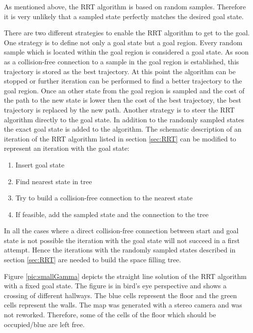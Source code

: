 As mentioned above, the RRT algorithm is based on random samples. Therefore it is very unlikely that a sampled state perfectly matches the desired goal state. \newline

There are two different strategies to enable the RRT algorithm to get to the goal. One strategy is to define not only a goal state but a goal region. Every random sample which is located within the goal region is considered a goal state. As soon as a collision-free connection to a sample in the goal region is established, this trajectory is stored as the best trajectory. At this point the algorithm can be stopped or further iteration can be performed to find a better trajectory to the goal region. Once an other state from the goal region is sampled and the cost of the path to the new state is lower then the cost of the best trajectory, the best trajectory is replaced by the new path. \newline
Another strategy is to steer the RRT algorithm directly to the goal state. In addition to the randomly sampled states the exact goal state is added to the algorithm. The schematic description of an iteration of the RRT algorithm listed in section \ref{sec:RRT} can be modified to represent an iteration with the goal state:

\begin{enumerate}
  \item Insert goal state
  \item Find nearest state in tree
  \item Try to build a collision-free connection to the nearest state
  \item If feasible, add the sampled state and the connection to the tree
\end{enumerate}

In all the cases where a direct collision-free connection between start and goal state is not possible the iteration with the goal state will not succeed in a first attempt. Hence the iterations with the randomly sampled states described in section \ref{sec:RRT} are needed to build the space filling tree.\newline

Figure \ref{pic:smallGamma} depicts the straight line solution of the RRT algorithm with a fixed goal state. The figure is in bird's eye perspective and shows a crossing of different hallways. The blue cells represent the floor and the green cells represent the walls. The map was generated with a stereo camera and was not reworked. Therefore, some of the cells of the floor which should be occupied/blue are left free. 

